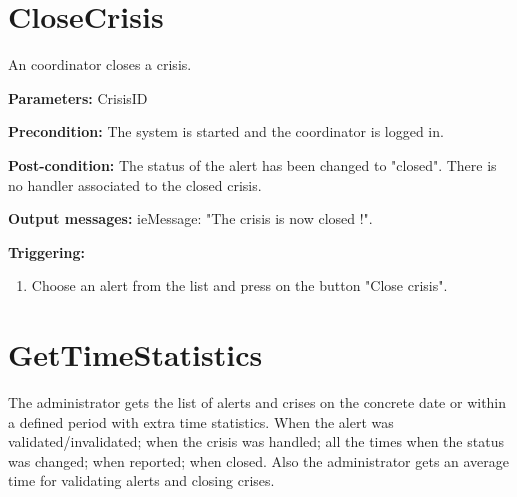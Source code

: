 \section{CloseCrisis}
\label{operation:CloseCrisis}

An coordinator closes a crisis.

\begin{description}
	\item \textbf{Parameters:} CrisisID
	\item \textbf{Precondition:} The system is started and the coordinator is
	logged in.
	\item \textbf{Post-condition:} The status of the alert has been changed to
	"closed". There is no handler associated to the closed crisis.
	\item \textbf{Output messages:} ieMessage: "The crisis is now closed !".
	
	\item \textbf{Triggering:}
	
	\begin{enumerate}
		\item Choose an alert from the list and press on the button "Close crisis".
	\end{enumerate}
\end{description}

\section{GetTimeStatistics}
\label{operation:GetTimeStatistics}

The administrator gets the list of alerts and crises on the concrete date or
within a defined period with extra time statistics.
When the alert was validated/invalidated; when the crisis was handled; all the times when the status was changed; when reported; when closed.
Also the administrator gets an average time for validating alerts and closing crises.


